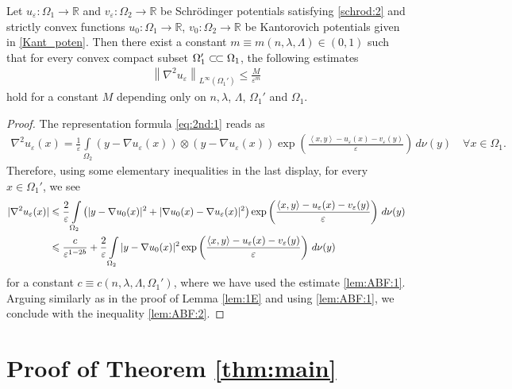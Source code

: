 \documentclass[reqno,12pt]{article}
\newcommand{\R}{\mathbb{R}}
\newcommand{\norm}[1]{\left\lVert#1\right\rVert}
\newcommand{\inner}[2]{\left\langle #1, #2 \right\rangle}
\newcommand{\I}{\int\limits}
\newcommand{\ssubset}{\subset\joinrel\subset}
\begin{document}
\begin{lemma}
    \label{lem:ABF}
    Let $u_{\varepsilon} : \Omega_1\rightarrow \R$ and $v_{\varepsilon} : \Omega_2\rightarrow \R$ be Schr\"odinger potentials satisfying \eqref{schrod:2} and strictly convex functions $u_0 : \Omega_{1}\rightarrow \R$, $v_{0} : \Omega_{2}\rightarrow \R$ be Kantorovich potentials given in \eqref{Kant_poten}. Then there exist a constant $m\equiv m(n,\lambda,\Lambda)\in (0,1)$ such that  for every convex compact subset $\Omega_{1}'\ssubset \Omega_{1}$, the following estimates 
    \begin{align}
        \label{lem:ABF:2}
        \norm{\nabla^2u_{\varepsilon}}_{L^{\infty}(\Omega_1')} \leqslant \frac{M}{\varepsilon^{m}}
    \end{align}
    hold for a constant $M$ depending only on $n,\lambda$, $\Lambda$, $\Omega_{1}'$ and $\Omega_{1}$. 
\end{lemma}
\begin{proof}
 The representation formula \eqref{eq:2nd:1} reads as 
\begin{align*}
    \nabla^2u_{\varepsilon}(x) = \frac{1}{\varepsilon}\I_{\Omega_{2}} (y-\nabla u_{\varepsilon}(x))\otimes (y-\nabla u_{\varepsilon}(x))\exp\left( \frac{\inner{x}{y}-u_{\varepsilon}(x)-v_{\varepsilon}(y)}{\varepsilon} \right)\,d\nu(y)\quad \forall x\in\Omega_{1}.
\end{align*}
Therefore, using some elementary inequalities in the last display, for every $x\in \Omega_{1}'$, we see 
\begin{align*}
    |\nabla^2u_{\varepsilon}(x)| 
    &\leqslant
    \frac{2}{\varepsilon} \I_{\Omega_{2}}  \left(|y-\nabla u_{0}(x)|^2 + |\nabla u_{0}(x)-\nabla u_{\varepsilon}(x)|^2\right)\exp\left( \frac{\inner{x}{y}-u_{\varepsilon}(x)-v_{\varepsilon}(y)}{\varepsilon} \right)\,d\nu(y)
    \notag\\&
    \leqslant
     \frac{c}{\varepsilon^{1-2b}} + \frac{2}{\varepsilon}\I_{\Omega_{2}}|y-\nabla u_{0}(x)|^{2} \exp\left( \frac{\inner{x}{y}-u_{\varepsilon}(x)-v_{\varepsilon}(y)}{\varepsilon} \right)\,d\nu(y)
\end{align*}
for a constant $c\equiv c(n,\lambda,\Lambda,\Omega_{1}')$, where we have used the estimate \eqref{lem:ABF:1}. Arguing similarly as in the proof of Lemma \ref{lem:1E} and using \eqref{lem:ABF:1}, we conclude with the inequality \eqref{lem:ABF:2}. 
\end{proof}

\section{Proof of Theorem \ref{thm:main}}
\end{document}
